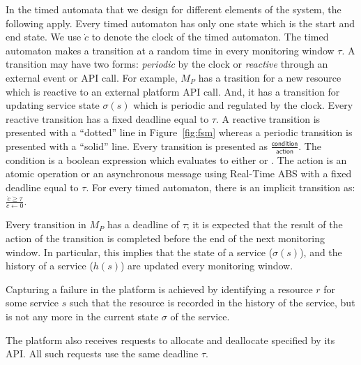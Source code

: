 In the timed automata that we design for different elements of the system, the following apply.
Every timed automaton has only one state which is the start and end state.
We use $\dot{c}$ to denote the clock of the timed automaton.
The timed automaton makes a transition at a random time in every monitoring window $\tau$.
A transition may have two forms: \emph{periodic} by the clock or \emph{reactive} through an external event or API call.
For example, $M_P$ has a trasition for  a new resource which is reactive to an external platform API call.
And, it has a transition for updating service state $\sigma(s)$ which is periodic and regulated by the clock. 
Every reactive transition has a fixed deadline equal to $\tau$.
A reactive transition is presented with a ``dotted'' line in Figure~\ref{fig:fsm} whereas a periodic transition is presented with a ``solid'' line.
Every transition is presented as $\frac{\textsf{condition}}{\textsf{action}}$.
The \textsf{condition} is a boolean expression which evaluates to either  or .
The \textsf{action} is an atomic operation or an asynchronous message using Real-Time ABS with a fixed deadline equal to $\tau$.
For every timed automaton, there is an implicit transition as: $\frac{\dot{c} \geq \tau}{\dot{c} \gets 0}$.

Every transition in $M_P$ has a deadline of $\tau$;
it is expected that the result of the action of the transition is completed before the end of the next monitoring window.
In particular, this implies that the state of a service ($\sigma(s)$), and the history of a service ($h(s)$) are updated every monitoring window.

Capturing a failure in the platform is achieved by identifying a resource $r$ for some service $s$ such that the resource is recorded in the history of the service, but is not any more in the current state $\sigma$ of the service.

The platform also receives requests to allocate and deallocate specified by its API. 
All such requests use the same deadline $\tau$.

